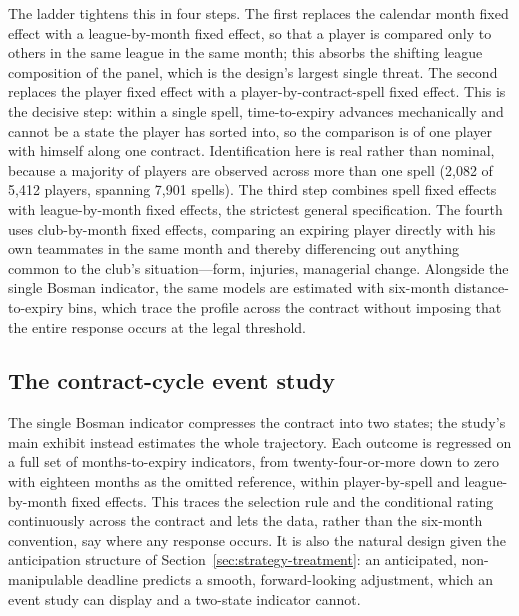 \documentclass{article}
\begin{document}
The ladder tightens this in four steps. The first replaces the calendar month
fixed effect with a league-by-month fixed effect, so that a player is compared only
to others in the same league in the same month; this absorbs the shifting league
composition of the panel, which is the design's largest single threat. The second
replaces the player fixed effect with a player-by-contract-spell fixed effect. This
is the decisive step: within a single spell, time-to-expiry advances mechanically
and cannot be a state the player has sorted into, so the comparison is of one
player with himself along one contract. Identification here is real rather than
nominal, because a majority of players are observed across more than one spell
(2{,}082 of 5{,}412 players, spanning 7{,}901 spells). The third step combines
spell fixed effects with league-by-month fixed effects, the strictest general
specification. The fourth uses club-by-month fixed effects, comparing an expiring
player directly with his own teammates in the same month and thereby differencing
out anything common to the club's situation---form, injuries, managerial change.
Alongside the single Bosman indicator, the same models are estimated with six-month
distance-to-expiry bins, which trace the profile across the contract without
imposing that the entire response occurs at the legal threshold.

\subsection{The contract-cycle event study}
\label{sec:strategy-eventstudy}

The single Bosman indicator compresses the contract into two states; the study's
main exhibit instead estimates the whole trajectory. Each outcome is regressed on a
full set of months-to-expiry indicators, from twenty-four-or-more down to zero with
eighteen months as the omitted reference, within player-by-spell and
league-by-month fixed effects. This traces the selection rule and the conditional
rating continuously across the contract and lets the data, rather than the
six-month convention, say where any response occurs. It is also the natural design
given the anticipation structure of Section~\ref{sec:strategy-treatment}: an
anticipated, non-manipulable deadline predicts a smooth, forward-looking adjustment,
which an event study can display and a two-state indicator cannot.
\end{document}
